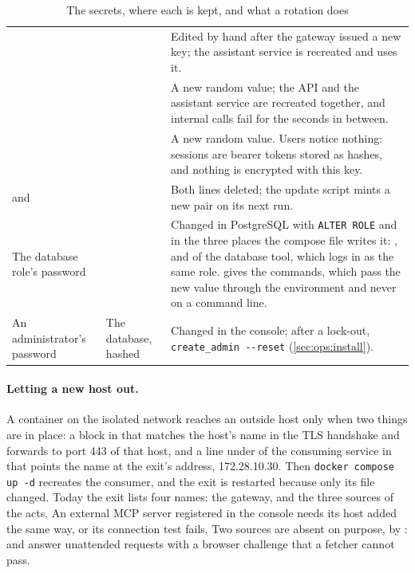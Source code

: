 \begin{table}[H]
\caption{The secrets, where each is kept, and what a rotation does}\label{tab:ops:secrets}
\begin{tabularx}{\textwidth}{@{}L{42mm}L{30mm}Y@{}}
\toprule
{} &  &  \\
\midrule
{} &  & Edited by hand after the gateway issued a new key; the assistant service is recreated and uses it. \\
 &  & A new random value; the API and the assistant service are recreated together, and internal calls fail for the seconds in between. \\
 &  & A new random value. Users notice nothing: sessions are bearer tokens stored as hashes, and nothing is encrypted with this key. \\
 and  &  & Both lines deleted; the update script mints a new pair on its next run. \\
The database role's password &  & Changed in PostgreSQL with \texttt{ALTER ROLE} and in the three places the compose file writes it: ,  and  of the database tool, which logs in as the same role.  gives the commands, which pass the new value through the environment and never on a command line. \\
An administrator's password & The database, hashed & Changed in the console; after a lock-out, \texttt{create\_admin -{}-reset} (\cref{sec:ops:install}). \\
\bottomrule
\end{tabularx}
\end{table}

\paragraph{Letting a new host out.} A container on the isolated network reaches an outside
host only when two things are in place: a block in  that matches the
host's name in the TLS handshake and forwards to port 443 of that host, and a line under
 of the consuming service in  that points the name
at the exit's address, 172.28.10.30. Then \texttt{docker compose up -d} recreates the consumer,
and the exit is restarted because only its file changed. Today the exit lists four names: the
gateway, and the three sources of the acts. An external MCP server registered in the console
needs its host added the same way, or its connection test fails. Two sources are absent on
purpose, by :  and 
answer unattended requests with a browser challenge that a fetcher cannot pass.

